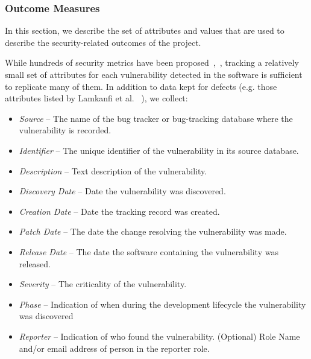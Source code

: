 \subsubsection{Outcome Measures}
In this section, we describe the set of attributes and values that are used to describe the security-related outcomes of the project. 

While hundreds of security metrics have been proposed~\cite{rudolph2012critical},~\cite{verendel2009quantified}, tracking a relatively small set of attributes for each vulnerability detected in the software is sufficient to replicate many of them. In addition to data kept for defects (e.g. those attributes listed by Lamkanfi et al.  ~\cite{lamkanfi2013eclipse}), we collect:
\begin{itemize}
\item \textit{Source} – The name of the bug tracker or bug-tracking database where the vulnerability is recorded.
\item \textit{Identifier} – The unique identifier of the vulnerability in its source database.
\item \textit{Description} – Text description of the vulnerability.
\item \textit{Discovery Date} – Date the vulnerability was discovered. 
\item \textit{Creation Date} – Date the tracking record was created.
\item \textit{Patch Date} – The date the change resolving the vulnerability was made.
\item \textit{Release Date} – The date the software containing the vulnerability was released.
\item \textit{Severity} – The criticality of the vulnerability. 
\item \textit{Phase}  – Indication of when during the development lifecycle the vulnerability was discovered
\item \textit{Reporter} – Indication of who found the vulnerability. (Optional) Role Name and/or email address of person in the reporter role. 
\end{itemize}

